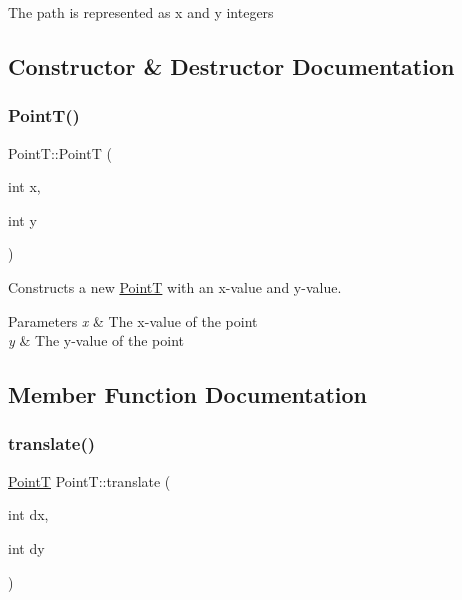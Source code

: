 The path is represented as x and y integers 

\subsection{Constructor \& Destructor Documentation}
\mbox{\label{class_point_t_aae04302c9aa775cceafff94d56be4089}} 
\subsubsection{\texorpdfstring{Point\+T()}{PointT()}}
{\footnotesize\ttfamily Point\+T\+::\+PointT (\begin{DoxyParamCaption}\item[{int}]{x,  }\item[{int}]{y }\end{DoxyParamCaption})}



Constructs a new \mbox{\hyperlink{class_point_t}{PointT}} with an x-\/value and y-\/value. 


\begin{DoxyParams}{Parameters}
{\em x} & The x-\/value of the point \\
\hline
{\em y} & The y-\/value of the point \\
\hline
\end{DoxyParams}


\subsection{Member Function Documentation}
\mbox{\label{class_point_t_adf263c54c1e9408c8e473e6f3ebb8834}} 
\subsubsection{\texorpdfstring{translate()}{translate()}}
{\footnotesize\ttfamily \mbox{\hyperlink{class_point_t}{PointT}} Point\+T\+::translate (\begin{DoxyParamCaption}\item[{int}]{dx,  }\item[{int}]{dy }\end{DoxyParamCaption})}



